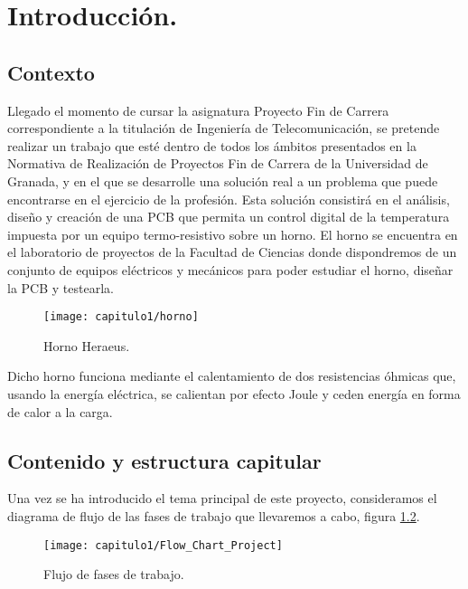 \chapter{Introducción.}
\label{cap:capitulo_1}
%

\section{Contexto}

Llegado el momento de cursar la asignatura Proyecto Fin de Carrera correspondiente a
la titulación de Ingeniería de Telecomunicación, se pretende realizar un trabajo que esté
dentro de todos los ámbitos presentados en la Normativa de Realización de Proyectos Fin
de Carrera de la Universidad de Granada, y en el que se desarrolle una solución real a un
problema que puede encontrarse en el ejercicio de la profesión.
Esta solución consistirá en el análisis, diseño y creación de una \acrshort{PCB} que permita un control digital de la temperatura impuesta por un equipo termo-resistivo sobre un horno. 
El horno se encuentra en el laboratorio de proyectos de la Facultad de Ciencias donde dispondremos de un conjunto de equipos eléctricos y mecánicos para poder estudiar el horno, diseñar la \acrshort{PCB}  y testearla. 

\smallskip
\begin{figure}[H]%
\noindent \begin{centering}
\texttt{[image: capitulo1/horno]}
\par\end{centering}
\smallskip
\caption{\label{fig:horno} Horno Heraeus.}
\end{figure} 


Dicho horno funciona mediante el calentamiento de dos resistencias óhmicas que, usando la energía eléctrica, se calientan por efecto Joule y ceden energía en forma de calor a la carga.



\section{Contenido y estructura capitular}

Una vez se ha introducido el tema principal de este proyecto, consideramos el diagrama de flujo de las fases de trabajo que llevaremos a cabo, figura \ref{fig:Flow_Chart_Project}.

\smallskip
\begin{figure}[H]%
\noindent \begin{centering}
\texttt{[image: capitulo1/Flow\_Chart\_Project]}
\par\end{centering}
\caption{\label{fig:Flow_Chart_Project} Flujo de fases de trabajo.}
\end{figure}
\smallskip

